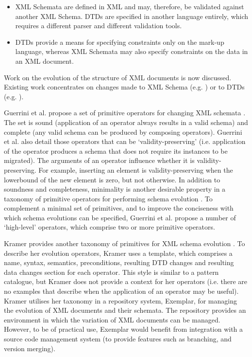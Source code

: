 \begin{itemize}
 \item XML Schemata are defined in XML and may, therefore, be validated against another XML Schema. DTDs are specified in another language entirely, which requires a different parser and different validation tools.
 \item DTDs provide a means for specifying constraints only on the mark-up language, whereas XML Schemata may also specify constraints on the data in an XML document.
\end{itemize}

Work on the evolution of the structure of XML documents is now discussed. Existing work concentrates on changes made to XML Schema (e.g. \cite{guerrini05impact}) or to DTDs (e.g. \cite{kramer01xem}).

Guerrini et al. \cc propose a set of primitive operators for changing XML schemata \cite{guerrini05impact}. The set is sound (application of an operator always results in a valid schema) and complete (any valid schema can be produced by composing operators). Guerrini et al. \cc also detail those operators that can be `validity-preserving' (i.e. application of the operator produces a schema that does not require its instances to be migrated). The arguments of an operator influence whether it is validity-preserving. For example, inserting an element is validity-preserving when the lowerbound of the new element is zero, but not otherwise. In addition to soundness and completeness, minimality is another desirable property in a taxonomy of primitive operators for performing schema evolution \cite{su01xem}. To complement a minimal set of primitives, and to improve the conciseness with which schema evolutions can be specified, Guerrini et al. propose a number of `high-level' operators, which comprise two or more primitive operators.

Kramer \cc provides another taxonomy of primitives for XML schema evolution \cite{kramer01xem}. To describe her evolution operators, Kramer uses a template, which comprises a name, syntax, semantics, preconditions, resulting DTD changes and resulting data changes section for each operator. This style is similar to a pattern catalogue, but Kramer does not provide a context for her operators (i.e. there are no examples that describe when the application of an operator may be useful). Kramer utilises her taxonomy in a repository system, Exemplar, for managing the evolution of XML documents and their schemata. The repository provides an environment in which the variation of XML documents can be managed. However, to be of practical use, Exemplar would benefit from integration with a source code management system (to provide features such as branching, and version merging).


